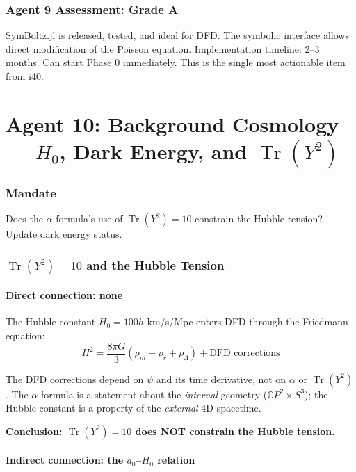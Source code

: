 \documentclass[11pt,a4paper]{article}
\newcommand{\Tr}{\operatorname{Tr}}
\newcommand{\CP}{\mathbb{C}P}
\begin{document}
\section{Agent 9 Assessment: Grade A}

SymBoltz.jl is released, tested, and ideal for DFD. The symbolic interface allows direct modification of the Poisson equation. Implementation timeline: 2--3 months. Can start Phase 0 immediately. This is the single most actionable item from i40.


\part{Agent 10: Background Cosmology --- $H_0$, Dark Energy, and $\Tr(Y^2)$}
\label{part:agent10}

\section{Mandate}
Does the $\alpha$ formula's use of $\Tr(Y^2) = 10$ constrain the Hubble tension? Update dark energy status.

\section{$\Tr(Y^2) = 10$ and the Hubble Tension}

\subsection{Direct connection: none}

The Hubble constant $H_0 = 100h$ km/s/Mpc enters DFD through the Friedmann equation:
\begin{equation}
H^2 = \frac{8\pi G}{3}(\rho_m + \rho_r + \rho_\Lambda) + \text{DFD corrections}
\end{equation}

The DFD corrections depend on $\psi$ and its time derivative, not on $\alpha$ or $\Tr(Y^2)$. The $\alpha$ formula is a statement about the \emph{internal} geometry ($\CP^2 \times S^3$); the Hubble constant is a property of the \emph{external} 4D spacetime.

\textbf{Conclusion: $\Tr(Y^2) = 10$ does NOT constrain the Hubble tension.}

\subsection{Indirect connection: the $a_0$--$H_0$ relation}
\end{document}
